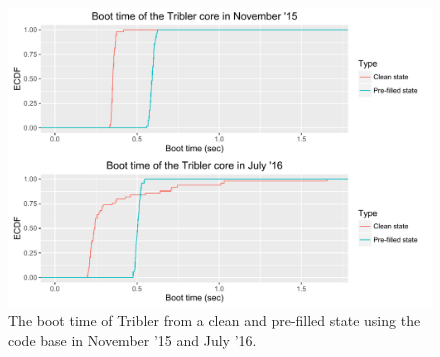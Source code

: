 \begin{figure}[!h]
	\centering
	\includegraphics[width=1.0\columnwidth]{images/experiments/startup}
	\caption{The boot time of Tribler from a clean and pre-filled state using the code base in November '15 and July '16.}
	\label{fig:startup_experiment}
\end{figure}

